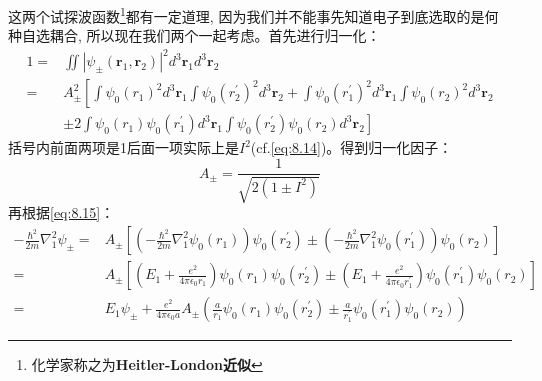 \documentclass[a4paper,zihao=-4,linespread=1]{ctexrep}
\begin{document}
    这两个试探波函数\footnote{化学家称之为\textbf{Heitler-London近似}}都有一定道理, 因为我们并不能事先知道电子到底选取的是何种自选耦合, 所以现在我们两个一起考虑。首先进行归一化：
    \begin{equation}
        \begin{aligned}
            1= & \iint\left|\psi_{\pm}\left(\mathbf{r}_{1}, \mathbf{r}_{2}\right)\right|^{2} d^{3} \mathbf{r}_{1} d^{3} \mathbf{r}_{2} \\
            = & A_{\pm}^{2}\left[\int \psi_{0}\left(r_{1}\right)^{2} d^{3} \mathbf{r}_{1} \int \psi_{0}\left(r_{2}^{\prime}\right)^{2} d^{3} \mathbf{r}_{2}+\int \psi_{0}\left(r_{1}^{\prime}\right)^{2} d^{3} \mathbf{r}_{1} \int \psi_{0}\left(r_{2}\right)^{2} d^{3} \mathbf{r}_{2}\right. \\
            & \left.\pm 2 \int \psi_{0}\left(r_{1}\right) \psi_{0}\left(r_{1}^{\prime}\right) d^{3} \mathbf{r}_{1} \int \psi_{0}\left(r_{2}^{\prime}\right) \psi_{0}\left(r_{2}\right) d^{3} \mathbf{r}_{2}\right]
        \end{aligned}
    \end{equation}
    括号内前面两项是1后面一项实际上是$I^2$(cf.\ref{eq:8.14})。得到归一化因子：
    \begin{equation}
        A_{\pm}=\frac{1}{\sqrt{2\left(1 \pm I^{2}\right)}}
    \end{equation}
    再根据\ref{eq:8.15}：
    \begin{equation}
        \begin{aligned}
            -\frac{\hbar^{2}}{2 m} \nabla_{1}^{2} \psi_{\pm}= & A_{\pm}\left[\left(-\frac{\hbar^{2}}{2 m} \nabla_{1}^{2} \psi_{0}\left(r_{1}\right)\right) \psi_{0}\left(r_{2}^{\prime}\right) \pm\left(-\frac{\hbar^{2}}{2 m} \nabla_{1}^{2} \psi_{0}\left(r_{1}^{\prime}\right)\right) \psi_{0}\left(r_{2}\right)\right] \\
            = & A_{\pm}\left[\left(E_{1}+\frac{e^{2}}{4 \pi \epsilon_{0} r_{1}}\right) \psi_{0}\left(r_{1}\right) \psi_{0}\left(r_{2}^{\prime}\right) \pm\left(E_{1}+\frac{e^{2}}{4 \pi \epsilon_{0} r_{1}^{\prime}}\right) \psi_{0}\left(r_{1}^{\prime}\right) \psi_{0}\left(r_{2}\right)\right] \\
            = & E_{1} \psi_{\pm}+\frac{e^{2}}{4 \pi \epsilon_{0} a} A_{\pm}\left(\frac{a}{r_{1}} \psi_{0}\left(r_{1}\right) \psi_{0}\left(r_{2}^{\prime}\right) \pm \frac{a}{r_{1}^{\prime}} \psi_{0}\left(r_{1}^{\prime}\right) \psi_{0}\left(r_{2}\right)\right) 
        \end{aligned}
    \end{equation}
\end{document}
